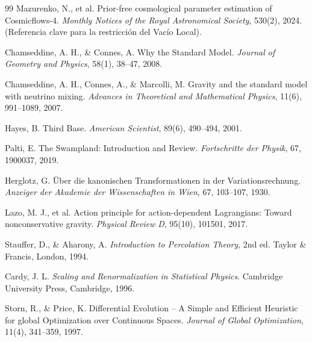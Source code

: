 \documentclass[12pt, a4paper]{article}
\theoremstyle{plain}
\theoremstyle{definition}
\begin{document}
\begin{thebibliography}{99}
Mazurenko, N., et al.
\newblock Prior-free cosmological parameter estimation of Cosmicflows-4.
\newblock \textit{Monthly Notices of the Royal Astronomical Society}, 530(2), 2024. (Referencia clave para la restricción del Vacío Local).

Chamseddine, A. H., \& Connes, A.
\newblock Why the Standard Model.
\newblock \textit{Journal of Geometry and Physics}, 58(1), 38–47, 2008.

Chamseddine, A. H., Connes, A., \& Marcolli, M.
\newblock Gravity and the standard model with neutrino mixing.
\newblock \textit{Advances in Theoretical and Mathematical Physics}, 11(6), 991–1089, 2007.

Hayes, B.
\newblock Third Base.
\newblock \textit{American Scientist}, 89(6), 490–494, 2001.

Palti, E.
\newblock The Swampland: Introduction and Review.
\newblock \textit{Fortschritte der Physik}, 67, 1900037, 2019.

Herglotz, G.
\newblock Über die kanonischen Transformationen in der Variationsrechnung.
\newblock \textit{Anzeiger der Akademie der Wissenschaften in Wien}, 67, 103–107, 1930.

Lazo, M. J., et al.
\newblock Action principle for action-dependent Lagrangians: Toward nonconservative gravity.
\newblock \textit{Physical Review D}, 95(10), 101501, 2017.

Stauffer, D., \& Aharony, A.
\newblock \textit{Introduction to Percolation Theory}, 2nd ed.
\newblock Taylor \& Francis, London, 1994.

Cardy, J. L.
\newblock \textit{Scaling and Renormalization in Statistical Physics}.
\newblock Cambridge University Press, Cambridge, 1996.

Storn, R., \& Price, K.
\newblock Differential Evolution – A Simple and Efficient Heuristic for global Optimization over Continuous Spaces.
\newblock \textit{Journal of Global Optimization}, 11(4), 341–359, 1997.

\end{thebibliography}
\end{document}
